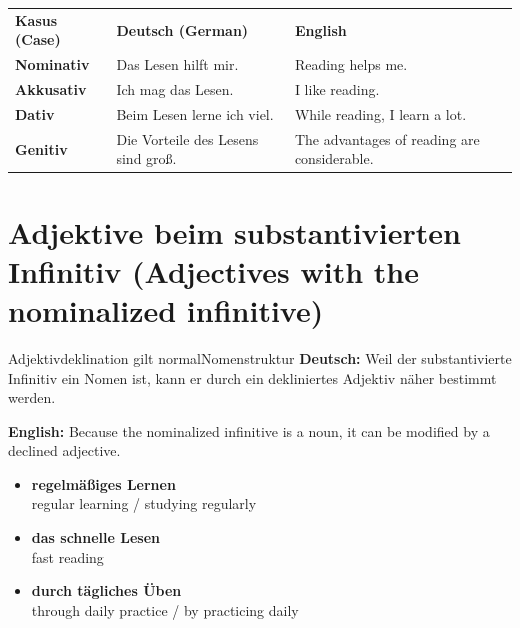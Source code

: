 \documentclass[a4paper,11pt]{article}
\newcommand{\GermanText}[1]{\textbf{Deutsch: }#1\par}
\newcommand{\EnglishText}[1]{{\small\color{SoftGray}\textbf{English: }#1\par}}
\newcommand{\ExampleItem}[2]{\item \textbf{#1}\\{\small\color{SoftGray}#2}}
\begin{document}
\begin{longtable}{>{\bfseries}p{2.8cm}|p{5.0cm}|p{5.4cm}}
\rowcolor{HeaderBlueDark}
\color{white}\textbf{Kasus (Case)} & \color{white}\textbf{Deutsch (German)} & \color{white}\textbf{English} \\
Nominativ & Das Lesen hilft mir. & Reading helps me. \\
Akkusativ & Ich mag das Lesen. & I like reading. \\
Dativ & Beim Lesen lerne ich viel. & While reading, I learn a lot. \\
Genitiv & Die Vorteile des Lesens sind groß. & The advantages of reading are considerable. \\
\end{longtable}

\section{Adjektive beim substantivierten Infinitiv \textnormal{(Adjectives with the nominalized infinitive)}}
\begin{grammarentry}{Adjektivdeklination gilt normal}{Nomenstruktur}
\GermanText{Weil der substantivierte Infinitiv ein Nomen ist, kann er durch ein dekliniertes Adjektiv näher bestimmt werden.}
\EnglishText{Because the nominalized infinitive is a noun, it can be modified by a declined adjective.}
\end{grammarentry}

\begin{exbox}
\begin{itemize}
\ExampleItem{regelmäßiges Lernen}{regular learning / studying regularly}
\ExampleItem{das schnelle Lesen}{fast reading}
\ExampleItem{durch tägliches Üben}{through daily practice / by practicing daily}
\end{itemize}
\end{exbox}
\end{document}
